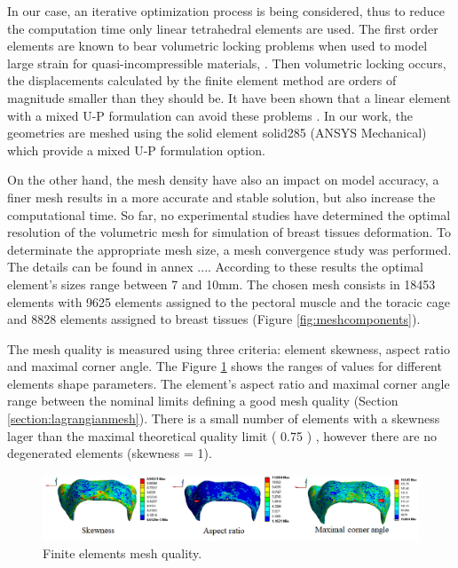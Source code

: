 In our case, an iterative optimization process is being considered, thus to reduce the computation time  only linear tetrahedral elements are used. The first order elements are known to bear volumetric locking problems when used to model large strain for quasi-incompressible materials, \citep{fung_classical_2017}. Then volumetric locking occurs, the displacements calculated by the finite element method are orders of magnitude smaller than they should be. It have been shown that a linear element with a mixed U-P formulation can avoid these problems \citep{rohan_finite_2014}. In our work, the geometries are meshed using the solid element solid285 (ANSYS Mechanical) which provide a mixed U-P formulation option. 

 On the other hand, the mesh density have also an impact on model accuracy, a finer mesh results in a more accurate and stable solution, but also increase the computational time. So far, no experimental studies have determined the optimal resolution of the volumetric mesh for simulation of breast tissues deformation. To determinate the appropriate mesh size, a mesh convergence study was performed. The details can be found in annex ....  According to these results the optimal element’s sizes range between 7 and 10mm. The chosen mesh consists in 18453 elements with 9625 elements assigned to the pectoral muscle and the toracic cage and 8828 elements assigned to breast tissues (Figure \ref{fig:meshcomponents}).
 
 
 The mesh quality is measured using three criteria: element skewness, aspect ratio and maximal corner angle. The Figure \ref{fig:meshquality} shows the ranges of values for different elements shape parameters. The element's aspect ratio and maximal corner angle range between the nominal limits defining a good mesh quality (Section \ref{section:lagrangianmesh}). There is a small number of elements with a skewness lager than the maximal theoretical quality limit ( 0.75 ) , however there are no degenerated elements (skewness = 1).  

\begin{figure}[!h]
\centering
\includegraphics[width=1\textwidth,keepaspectratio]{figures/meshquality.png} 
\caption{Finite elements mesh quality.}\label{fig:meshquality}
\end{figure}


